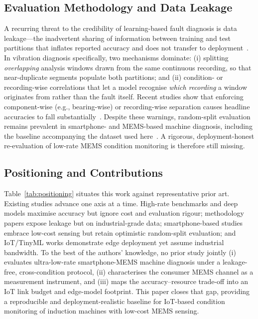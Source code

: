 \subsection{Evaluation Methodology and Data Leakage}
\label{subsec:leakage}
A recurring threat to the credibility of learning-based fault diagnosis is data
leakage---the inadvertent sharing of information between training and test
partitions that inflates reported accuracy and does not transfer to
deployment~\cite{kapoor2023leakage}. In vibration diagnosis specifically, two
mechanisms dominate: (i) splitting \emph{overlapping} analysis windows drawn from
the same continuous recording, so that near-duplicate segments populate both
partitions; and (ii) condition- or recording-wise correlations that let a model
recognise \emph{which recording} a window originates from rather than the fault
itself. Recent studies show that enforcing component-wise (e.g., bearing-wise) or
recording-wise separation causes headline accuracies to fall
substantially~\cite{wheat2024impact, hendriks2022towards}. Despite these
warnings, random-split evaluation remains prevalent in smartphone- and
MEMS-based machine diagnosis, including the baseline accompanying the dataset used
here~\cite{ertargin2026smartphone}. A rigorous, deployment-honest re-evaluation
of low-rate MEMS condition monitoring is therefore still missing.

\subsection{Positioning and Contributions}
Table~\ref{tab:positioning} situates this work against representative prior art.
Existing studies advance one axis at a time. High-rate benchmarks and deep models
maximise accuracy but ignore cost and evaluation rigour; methodology papers expose
leakage but on industrial-grade data; smartphone-based studies embrace low-cost
sensing but retain optimistic random-split evaluation; and IoT/TinyML works
demonstrate edge deployment yet assume industrial bandwidth. To the best of the
authors' knowledge, no prior study jointly (i) evaluates ultra-low-rate
smartphone-MEMS machine diagnosis
under a leakage-free, cross-condition protocol, (ii) characterises the consumer
MEMS channel as a measurement instrument, and (iii) maps the accuracy--resource
trade-off into an IoT link budget and edge-model footprint. This paper closes that
gap, providing a reproducible and deployment-realistic baseline for
IoT-based condition monitoring of induction machines with low-cost MEMS sensing.

